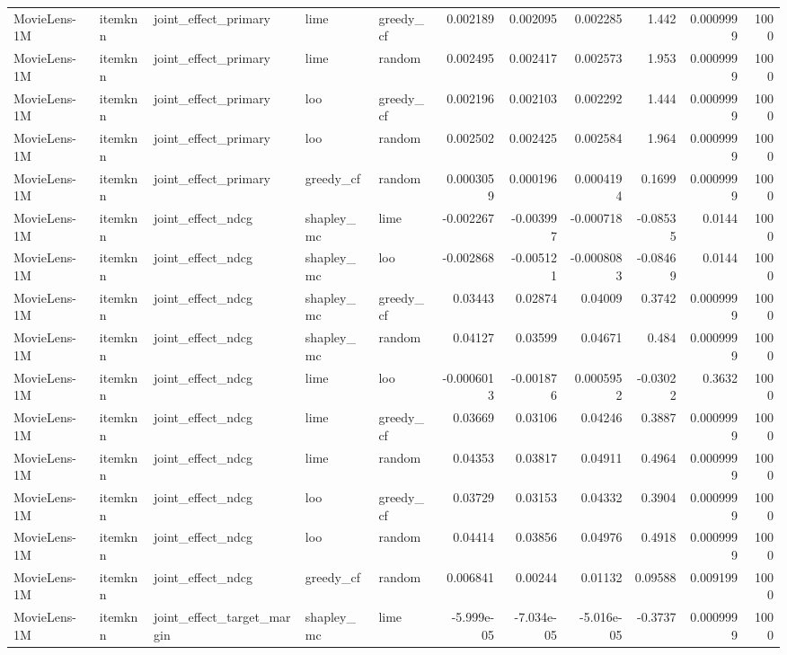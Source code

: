 \begin{table}[t]
\begin{tabular}{lllllrrrrrr}
MovieLens-1M & itemknn & joint\_effect\_primary & lime & greedy\_cf & 0.002189 & 0.002095 & 0.002285 & 1.442 & 0.0009999 & 1000 \\
MovieLens-1M & itemknn & joint\_effect\_primary & lime & random & 0.002495 & 0.002417 & 0.002573 & 1.953 & 0.0009999 & 1000 \\
MovieLens-1M & itemknn & joint\_effect\_primary & loo & greedy\_cf & 0.002196 & 0.002103 & 0.002292 & 1.444 & 0.0009999 & 1000 \\
MovieLens-1M & itemknn & joint\_effect\_primary & loo & random & 0.002502 & 0.002425 & 0.002584 & 1.964 & 0.0009999 & 1000 \\
MovieLens-1M & itemknn & joint\_effect\_primary & greedy\_cf & random & 0.0003059 & 0.000196 & 0.0004194 & 0.1699 & 0.0009999 & 1000 \\
MovieLens-1M & itemknn & joint\_effect\_ndcg & shapley\_mc & lime & -0.002267 & -0.003997 & -0.000718 & -0.08535 & 0.0144 & 1000 \\
MovieLens-1M & itemknn & joint\_effect\_ndcg & shapley\_mc & loo & -0.002868 & -0.005121 & -0.0008083 & -0.08469 & 0.0144 & 1000 \\
MovieLens-1M & itemknn & joint\_effect\_ndcg & shapley\_mc & greedy\_cf & 0.03443 & 0.02874 & 0.04009 & 0.3742 & 0.0009999 & 1000 \\
MovieLens-1M & itemknn & joint\_effect\_ndcg & shapley\_mc & random & 0.04127 & 0.03599 & 0.04671 & 0.484 & 0.0009999 & 1000 \\
MovieLens-1M & itemknn & joint\_effect\_ndcg & lime & loo & -0.0006013 & -0.001876 & 0.0005952 & -0.03022 & 0.3632 & 1000 \\
MovieLens-1M & itemknn & joint\_effect\_ndcg & lime & greedy\_cf & 0.03669 & 0.03106 & 0.04246 & 0.3887 & 0.0009999 & 1000 \\
MovieLens-1M & itemknn & joint\_effect\_ndcg & lime & random & 0.04353 & 0.03817 & 0.04911 & 0.4964 & 0.0009999 & 1000 \\
MovieLens-1M & itemknn & joint\_effect\_ndcg & loo & greedy\_cf & 0.03729 & 0.03153 & 0.04332 & 0.3904 & 0.0009999 & 1000 \\
MovieLens-1M & itemknn & joint\_effect\_ndcg & loo & random & 0.04414 & 0.03856 & 0.04976 & 0.4918 & 0.0009999 & 1000 \\
MovieLens-1M & itemknn & joint\_effect\_ndcg & greedy\_cf & random & 0.006841 & 0.00244 & 0.01132 & 0.09588 & 0.009199 & 1000 \\
MovieLens-1M & itemknn & joint\_effect\_target\_margin & shapley\_mc & lime & -5.999e-05 & -7.034e-05 & -5.016e-05 & -0.3737 & 0.0009999 & 1000 \\

\end{tabular}
\end{table}
